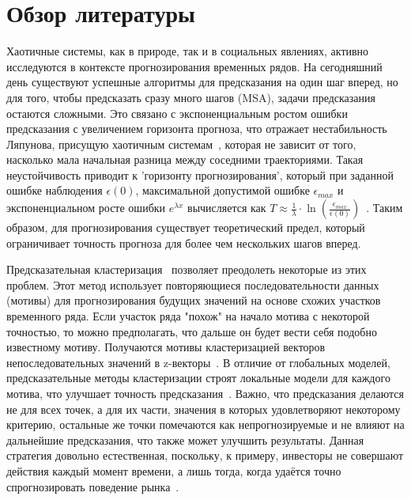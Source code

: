 \documentclass[a4paper, 12pt]{extarticle}
\begin{document}
\newpage
\section{Обзор литературы}

Хаотичные системы, как в природе, так и в социальных явлениях, активно исследуются в контексте прогнозирования временных рядов. На сегодняшний день существуют успешные алгоритмы для предсказания на один шаг вперед, но для того, чтобы предсказать сразу много шагов (MSA), задачи предсказания остаются сложными. Это связано с экспоненциальным ростом ошибки предсказания с увеличением горизонта прогноза, что отражает нестабильность Ляпунова, присущую хаотичным системам~\cite{Kantz03}, которая не зависит от того, насколько мала начальная разница между соседними траекториями. Такая неустойчивость приводит к 'горизонту прогнозирования', который при заданной ошибке наблюдения $\epsilon(0)$, максимальной допустимой ошибке $\epsilon_{max}$ и экспоненциальном росте ошибки $e^{\lambda x}$ вычисляется как $T\approx \frac{1}{\lambda}\cdot\ln{\left(\frac{\epsilon_{max}}{\epsilon(0)}\right)}$~\cite{Potapov00}. Таким образом, для прогнозирования существует теоретический предел, который ограничивает точность прогноза для более чем нескольких шагов вперед.

Предсказательная кластеризация~\cite{Blockeel98} позволяет преодолеть некоторые из этих проблем. Этот метод использует повторяющиеся последовательности данных (мотивы) для прогнозирования будущих значений на основе схожих участков временного ряда. Если участок ряда "похож" на начало мотива с некоторой точностью, то можно предполагать, что дальше он будет вести себя подобно известному мотиву. Получаются мотивы кластеризацией векторов непоследовательных значений в z-векторы~\cite{Small05}. В отличие от глобальных моделей, предсказательные методы кластеризации строят локальные модели для каждого мотива, что улучшает точность предсказания~\cite{Taieb10}. Важно, что предсказания делаются не для всех точек, а для их части, значения в которых удовлетворяют некоторому критерию, остальные же точки помечаются как непрогнозируемые и не влияют на дальнейшие предсказания, что также может улучшить результаты. Данная стратегия довольно естественная, поскольку, к примеру, инвесторы не совершают действия каждый момент времени, а лишь тогда, когда удаётся точно спрогнозировать поведение рынка~\cite{Gromov15}.
\end{document}
